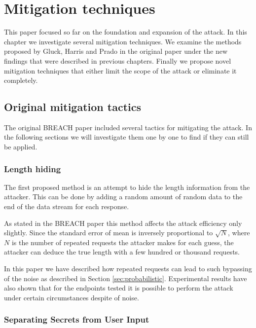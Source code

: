\chapter{Mitigation techniques}\label{ch:mitigation}

This paper focused so far on the foundation and expansion of the attack. In
this chapter we investigate several mitigation techniques. We examine
the methods proposed by Gluck, Harris and Prado in the original paper under the
new findings that were described in previous chapters. Finally we propose
novel mitigation techniques that either limit the scope of the attack or
eliminate it completely.

\section{Original mitigation tactics}\label{sec:original_mitigation}

The original BREACH paper \cite{breach} included several tactics for mitigating
the attack. In the following sections we will investigate them one by one to
find if they can still be applied.

\subsection{Length hiding}

The first proposed method is an attempt to hide the length information from the
attacker. This can be done by adding a random amount of random data to the end
of the data stream for each response.

As stated in the BREACH paper this method affects the attack efficiency only
slightly. Since the standard error of mean is inversely proportional to
\begin{math}\sqrt{N}\end{math}, where \begin{math}N\end{math} is the number of
repeated requests the attacker makes for each guess, the attacker can deduce the
true length with a few hundred or thousand requests.

In this paper we have described how repeated requests can lead to such bypassing
of the noise as described in Section \ref{sec:probabilistic}. Experimental
results have also shown that for the endpoints tested it is possible to
perform the attack under certain circumstances despite of noise.

\subsection{Separating Secrets from User Input}\label{subsec:sep_compression}

